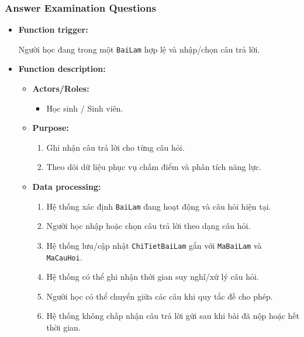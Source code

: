 \documentclass[12pt,a4paper,oneside]{report}
\begin{document}
\subsubsection{Answer Examination Questions}
\label{subsubsec:answer-exam-questions}

\begin{itemize}

    \item \textbf{Function trigger:}

    Người học đang trong một \texttt{BaiLam} hợp lệ và nhập/chọn câu trả lời.

    \item \textbf{Function description:}

    \begin{itemize}

        \item \textbf{Actors/Roles:}
        \begin{itemize}
            \item Học sinh / Sinh viên.
        \end{itemize}

        \item \textbf{Purpose:}
        \begin{enumerate}
            \item Ghi nhận câu trả lời cho từng câu hỏi.
            \item Theo dõi dữ liệu phục vụ chấm điểm và phân tích năng lực.
        \end{enumerate}

        \item \textbf{Data processing:}
        \begin{enumerate}
            \item Hệ thống xác định \texttt{BaiLam} đang hoạt động và câu hỏi hiện tại.
            \item Người học nhập hoặc chọn câu trả lời theo dạng câu hỏi.
            \item Hệ thống lưu/cập nhật \texttt{ChiTietBaiLam} gắn với \texttt{MaBaiLam} và \texttt{MaCauHoi}.
            \item Hệ thống có thể ghi nhận thời gian suy nghĩ/xử lý câu hỏi.
            \item Người học có thể chuyển giữa các câu khi quy tắc đề cho phép.
            \item Hệ thống không chấp nhận câu trả lời gửi sau khi bài đã nộp hoặc hết thời gian.
        \end{enumerate}


\end{itemize}
\end{itemize}
\end{document}
